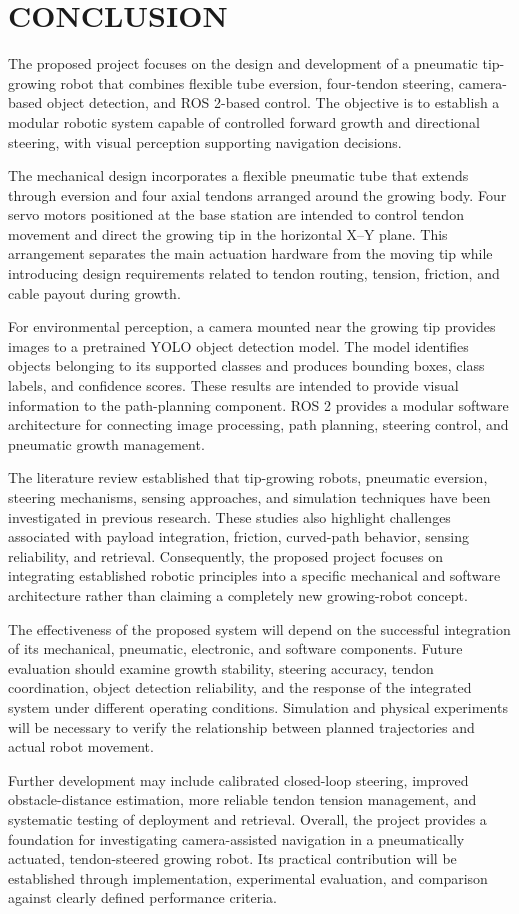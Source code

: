 \chapter{CONCLUSION}

The proposed project focuses on the design and development of a pneumatic tip-growing robot that combines flexible tube eversion, four-tendon steering, camera-based object detection, and ROS 2-based control. The objective is to establish a modular robotic system capable of controlled forward growth and directional steering, with visual perception supporting navigation decisions.

The mechanical design incorporates a flexible pneumatic tube that extends through eversion and four axial tendons arranged around the growing body. Four servo motors positioned at the base station are intended to control tendon movement and direct the growing tip in the horizontal X--Y plane. This arrangement separates the main actuation hardware from the moving tip while introducing design requirements related to tendon routing, tension, friction, and cable payout during growth.

For environmental perception, a camera mounted near the growing tip provides images to a pretrained YOLO object detection model. The model identifies objects belonging to its supported classes and produces bounding boxes, class labels, and confidence scores. These results are intended to provide visual information to the path-planning component. ROS 2 provides a modular software architecture for connecting image processing, path planning, steering control, and pneumatic growth management.

The literature review established that tip-growing robots, pneumatic eversion, steering mechanisms, sensing approaches, and simulation techniques have been investigated in previous research. These studies also highlight challenges associated with payload integration, friction, curved-path behavior, sensing reliability, and retrieval. Consequently, the proposed project focuses on integrating established robotic principles into a specific mechanical and software architecture rather than claiming a completely new growing-robot concept.

The effectiveness of the proposed system will depend on the successful integration of its mechanical, pneumatic, electronic, and software components. Future evaluation should examine growth stability, steering accuracy, tendon coordination, object detection reliability, and the response of the integrated system under different operating conditions. Simulation and physical experiments will be necessary to verify the relationship between planned trajectories and actual robot movement.

Further development may include calibrated closed-loop steering, improved obstacle-distance estimation, more reliable tendon tension management, and systematic testing of deployment and retrieval. Overall, the project provides a foundation for investigating camera-assisted navigation in a pneumatically actuated, tendon-steered growing robot. Its practical contribution will be established through implementation, experimental evaluation, and comparison against clearly defined performance criteria.